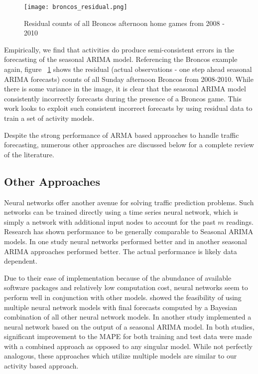 \begin{figure}[ht]
\begin{center}
\texttt{[image: broncos\_residual.png]}
\end{center}
\caption{Residual counts of all Broncos afternoon home games from 2008 - 2010}
\label{fig:broncos_residual}
\end{figure}

Empirically, we find that activities do produce semi-consistent errors in the forecasting of the seasonal ARIMA model.  Referencing the Broncos example again, figure ~\ref{fig:broncos_residual} shows the residual (actual observations - one step ahead seasonal ARIMA forecasts) counts of all Sunday afternoon Broncos from 2008-2010.  While there is some variance in the image, it is clear that the seasonal ARIMA model consistently incorrectly forecasts during the presence of a Broncos game.  This work looks to exploit such consistent incorrect forecasts by using residual data to train a set of activity models.

Despite the strong performance of ARMA based approaches to handle traffic forecasting, numerous other approaches are discussed below for a complete review of the literature.

\subsection{Other Approaches}
Neural networks offer another avenue for solving traffic prediction problems.  Such networks can be trained directly using a time series neural network, which is simply a network with additional input nodes to account for the past $m$ readings.  Research \cite{Taylor2006,Ishak2004} has shown performance to be generally comparable to Seasonal ARIMA models.  In one study neural networks performed better and in another seasonal ARIMA approaches performed better.  The actual performance is likely data dependent.

Due to their ease of implementation because of the abundance of available software packages and relatively low computation cost, neural networks seem to perform well in conjunction with other models.  \cite{Zheng2006} showed the feasibility of using multiple neural network models with final forecasts computed by a Bayesian combination of all other neural network models.  In another study \cite{Tseng2002} implemented a neural network based on the output of a seasonal ARIMA model.    In both studies, significant improvement to the MAPE for both training and test data were made with a combined approach as opposed to any singular model.  While not perfectly analogous, these approaches which utilize multiple models are similar to our activity based approach.

